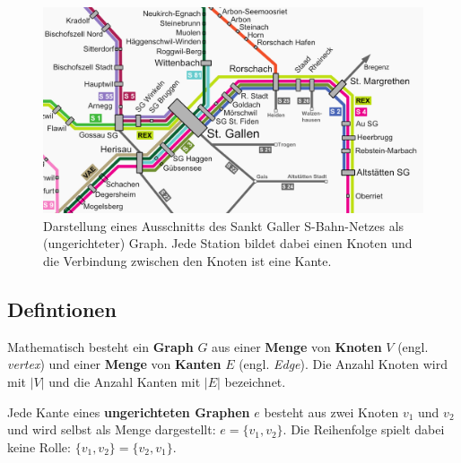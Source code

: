 \begin{figure}[htb]
\begin{center}

\includegraphics[width=.67\textwidth]{../fig/sbahn_netz_ausschnitt.png}
\caption{Darstellung eines Ausschnitts des Sankt Galler S-Bahn-Netzes als (ungerichteter) Graph.
Jede Station bildet dabei einen Knoten und die Verbindung zwischen den Knoten ist eine Kante.
}

\label{fig:sbahn}
\end{center}
\end{figure}


\subsection{Defintionen}

\begin{mdef}
Mathematisch besteht ein \textbf{Graph} $G$ aus einer \textbf{Menge} von \textbf{Knoten} $V$ (engl. \emph{vertex}) und einer \textbf{Menge} von \textbf{Kanten} $E$ (engl. \emph{Edge}).
Die Anzahl Knoten wird mit $|V|$ und die Anzahl Kanten mit $|E|$ bezeichnet.
\end{mdef}



\begin{mdef}
Jede Kante eines \textbf{ungerichteten Graphen} $e$ besteht aus zwei Knoten $v_1$ und $v_2$ und wird selbst als Menge dargestellt: $e= \{v_1,v_2\}$.
Die Reihenfolge spielt dabei keine Rolle: $\{v_1,v_2\} = \{v_2,v_1\}$.
\end{mdef}

